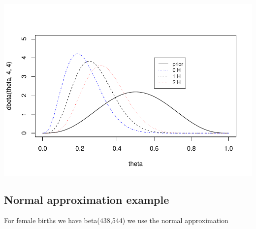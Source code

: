 \documentclass[
]{book}
\theoremstyle{definition}
\theoremstyle{definition}
\theoremstyle{definition}
\theoremstyle{definition}
\theoremstyle{remark}
\begin{document}
\includegraphics{_main_files/figure-latex/q1-1.pdf}

\hypertarget{normal-approximation-example}{%
\subsection*{Normal approximation example}\label{normal-approximation-example}}

For female births we have beta(438,544) we use the normal approximation
\end{document}
